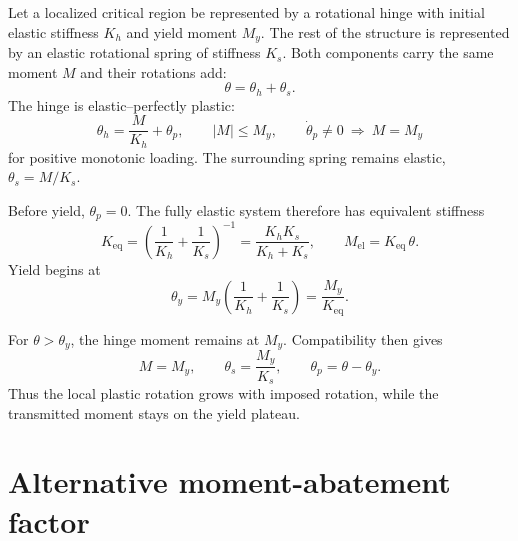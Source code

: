 \documentclass[11pt,a4paper]{article}
\begin{document}
Let a localized critical region be represented by a rotational hinge with initial elastic stiffness $K_h$ and yield moment $M_y$. The rest of the structure is represented by an elastic rotational spring of stiffness $K_s$. Both components carry the same moment $M$ and their rotations add:
\begin{equation}
\theta=\theta_h+\theta_s.
\label{eq:compatibility}
\end{equation}
The hinge is elastic--perfectly plastic:
\begin{equation}
\theta_h=\frac{M}{K_h}+\theta_p,\qquad
|M|\leq M_y,\qquad
\dot{\theta}_p\neq0\ \Longrightarrow\ M=M_y
\end{equation}
for positive monotonic loading. The surrounding spring remains elastic, $\theta_s=M/K_s$.

Before yield, $\theta_p=0$. The fully elastic system therefore has equivalent stiffness
\begin{equation}
K_{\mathrm{eq}}=
\left(\frac{1}{K_h}+\frac{1}{K_s}\right)^{-1}
=\frac{K_hK_s}{K_h+K_s},
\qquad M_{\mathrm{el}}=K_{\mathrm{eq}}\,\theta.
\label{eq:elastic}
\end{equation}
Yield begins at
\begin{equation}
\theta_y=M_y\left(\frac{1}{K_h}+\frac{1}{K_s}\right)
=\frac{M_y}{K_{\mathrm{eq}}}.
\label{eq:yield-rotation}
\end{equation}

For $\theta>\theta_y$, the hinge moment remains at $M_y$. Compatibility then gives
\begin{equation}
M=M_y,\qquad
\theta_s=\frac{M_y}{K_s},\qquad
\theta_p=\theta-\theta_y.
\label{eq:plastic-response}
\end{equation}
Thus the local plastic rotation grows with imposed rotation, while the transmitted moment stays on the yield plateau.

\section{Alternative moment-abatement factor}
\end{document}
